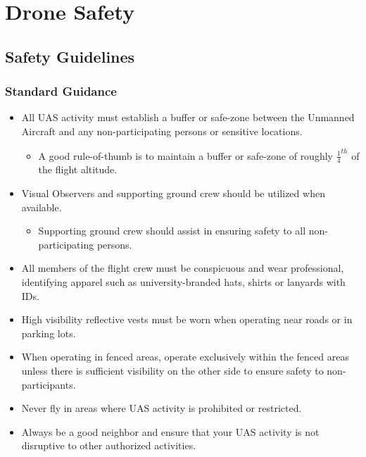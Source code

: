 \documentclass[
]{book}
\providecommand{\tightlist}{%
  \setlength{\itemsep}{0pt}\setlength{\parskip}{0pt}}
\begin{document}
\hypertarget{part-drone-safety}{%
\part{Drone Safety}\label{part-drone-safety}}

\hypertarget{ch-safety-guidelines}{%
\chapter{Safety Guidelines}\label{ch-safety-guidelines}}

\hypertarget{standard-guidance}{%
\section{Standard Guidance}\label{standard-guidance}}

\begin{itemize}
\tightlist
\item
  All UAS activity must establish a buffer or safe-zone between the Unmanned Aircraft and any non-participating persons or sensitive locations.

  \begin{itemize}
  \tightlist
  \item
    A good rule-of-thumb is to maintain a buffer or safe-zone of roughly \(\frac{1}{4}^{th}\) of the flight altitude.
  \end{itemize}
\item
  Visual Observers and supporting ground crew should be utilized when available.

  \begin{itemize}
  \tightlist
  \item
    Supporting ground crew should assist in ensuring safety to all non-participating persons.
  \end{itemize}
\item
  All members of the flight crew must be conspicuous and wear professional, identifying apparel such as university-branded hats, shirts or lanyards with IDs.
\item
  High visibility reflective vests must be worn when operating near roads or in parking lots.\\
\item
  When operating in fenced areas, operate exclusively within the fenced areas unless there is sufficient visibility on the other side to ensure safety to non-participants.
\item
  Never fly in areas where UAS activity is prohibited or restricted.
\item
  Always be a good neighbor and ensure that your UAS activity is not disruptive to other authorized activities.
\end{itemize}
\end{document}

